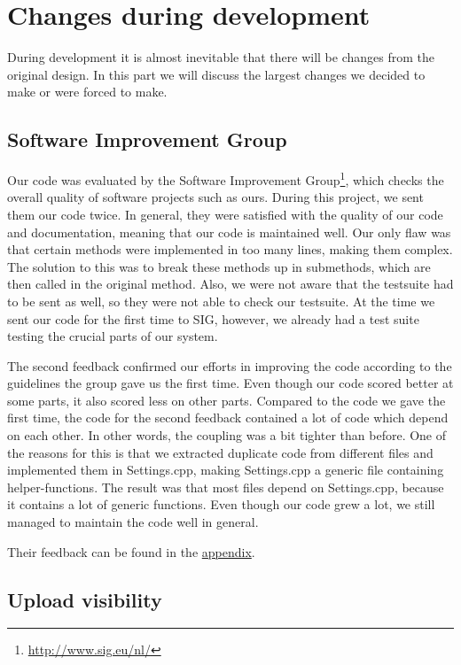 \section{Changes during development}
During development it is almost inevitable that there will be changes from the original design. In this part we will discuss the largest changes we decided to make or were forced to make.

\subsection{Software Improvement Group}
Our code was evaluated by the Software Improvement Group\footnote{\url{http://www.sig.eu/nl/}}, which checks the overall quality of software projects such as ours. 
During this project, we sent them our code twice. In general, they were satisfied with the quality of our code and documentation, meaning that our
code is maintained well. Our only flaw was that certain methods were implemented in too many lines, making them complex.
The solution to this was to break these methods up in submethods, which are then called in the original method. Also, we were not aware that the testsuite 
had to be sent as well, so they were not able to check our testsuite. At the time we sent our code for the first time to SIG, however, we already had a test suite testing
the crucial parts of our system.

The second feedback confirmed our efforts in improving the code according to the guidelines the group gave us the first time.
Even though our code scored better at some parts, it also scored less on other parts. Compared to the code we gave the first time,
the code for the second feedback contained a lot of code which depend on each other. In other words, the coupling was a bit tighter than before.
One of the reasons for this is that we extracted duplicate code from different files and implemented them in Settings.cpp, making Settings.cpp
a generic file containing helper-functions. The result was that most files depend on Settings.cpp, because it contains a lot of generic functions.
Even though our code grew a lot, we still managed to maintain the code well in general.

Their feedback can be found in the \hyperref[sec:sig]{appendix}.

\subsection{Upload visibility}

